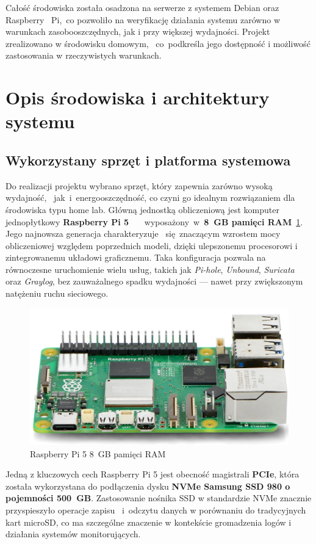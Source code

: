 \documentclass[
    left=2.5cm,         %
    right=2.5cm,        %
    top=2.5cm,          %
    bottom=3cm,         %
    bindingoffset=6mm,  %
    nohyphenation=true %
]{eiti/eiti-thesis} %
\begin{document}
Całość środowiska została osadzona na serwerze z systemem Debian oraz Raspberry ~Pi,~co pozwoliło na weryfikację działania systemu zarówno w warunkach zasobooszczędnych, jak i przy większej wydajności. Projekt zrealizowano w środowisku domowym, ~co~podkreśla jego dostępność i możliwość zastosowania w rzeczywistych warunkach.

\newpage 
\section{Opis środowiska i architektury systemu}
\subsection{Wykorzystany sprzęt i platforma systemowa}

Do realizacji projektu wybrano sprzęt, który zapewnia zarówno wysoką wydajność, ~jak~i~energooszczędność, co czyni go idealnym rozwiązaniem dla środowiska typu home lab. Główną jednostką obliczeniową jest komputer jednopłytkowy \textbf{Raspberry Pi 5}\cite{raspberry-start} ~~~wyposażony~w~\textbf{8~GB pamięci RAM}~\ref{fig:raspberry}. Jego najnowsza generacja charakteryzuje ~się~znaczącym wzrostem mocy obliczeniowej względem poprzednich modeli, dzięki ulepszonemu procesorowi 
i zintegrowanemu układowi graficznemu. Taka konfiguracja pozwala na równoczesne uruchomienie wielu usług, takich jak \textit{Pi-hole}, \textit{Unbound}, \textit{Suricata} oraz \textit{Graylog}, bez zauważalnego spadku wydajności — nawet przy zwiększonym natężeniu ruchu sieciowego.
\begin{figure}[H]
    \centering
    \includegraphics[width=\textwidth]{img/raspberry_pi_5.png}
    \caption{Raspberry Pi 5 8~GB pamięci RAM}
    \label{fig:raspberry}
\end{figure}

Jedną z kluczowych cech Raspberry Pi 5 jest obecność magistrali \textbf{PCIe}, która została wykorzystana do podłączenia dysku \textbf{NVMe Samsung SSD 980 o pojemności 500~GB}. Zastosowanie nośnika SSD w standardzie NVMe znacznie przyspieszyło operacje zapisu ~i~odczytu danych w porównaniu do tradycyjnych kart microSD, 
co ma szczególne znaczenie w kontekście gromadzenia logów i działania systemów monitorujących.
\end{document}
